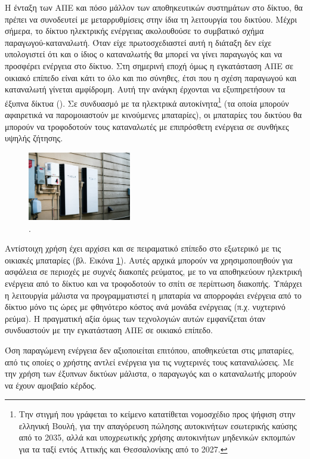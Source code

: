 \documentclass[12pt]{report}
\begin{document}
Η ένταξη των ΑΠΕ και πόσο μάλλον των αποθηκευτικών συστημάτων στο δίκτυο, θα πρέπει να συνοδευτεί με μεταρρυθμίσεις στην ίδια τη λειτουργία του δικτύου. Μέχρι σήμερα, το δίκτυο ηλεκτρικής ενέργειας ακολουθούσε το συμβατικό σχήμα 
παραγωγού-καταναλωτή. Όταν είχε πρωτοσχεδιαστεί αυτή η διάταξη δεν είχε υπολογιστεί ότι και ο ίδιος ο καταναλωτής θα μπορεί να γίνει παραγωγός και να προσφέρει ενέργεια στο δίκτυο. Στη σημερινή εποχή όμως η εγκατάσταση ΑΠΕ σε 
οικιακό επίπεδο είναι κάτι το όλο και πιο σύνηθες, έτσι που η σχέση παραγωγού και καταναλωτή γίνεται αμφίδρομη. Αυτή την ανάγκη έρχονται να εξυπηρετήσουν τα έξυπνα δίκτυα ({}). Σε συνδυασμό με τα ηλεκτρικά 
αυτοκίνητα\footnote{Την στιγμή που γράφεται το κείμενο κατατίθεται νομοσχέδιο προς ψήφιση στην ελληνική Βουλή, για την απαγόρευση πώλησης αυτοκινήτων εσωτερικής καύσης από το 2035, αλλά και υποχρεωτικής χρήσης αυτοκινήτων μηδενικών 
εκπομπών για τα ταξί εντός Αττικής και Θεσσαλονίκης από το 2027.} (τα οποία μπορούν αφαιρετικά να παρομοιαστούν με κινούμενες μπαταρίες), οι μπαταρίες του δικτύου θα μπορούν να τροφοδοτούν τους καταναλωτές με επιπρόσθετη ενέργεια σε 
συνθήκες υψηλής ζήτησης.

\begin{figure}[h]
				\center
				\includegraphics[width=0.4\textwidth]{powerwall}
				\captionsetup{name=Εικόνα}
				\caption{{}.}
				\label{fig:powerwall}
\end{figure}

Αντίστοιχη χρήση έχει αρχίσει και σε πειραματικό επίπεδο στο εξωτερικό με τις οικιακές μπαταρίες (βλ. Εικόνα \ref{fig:powerwall}). Αυτές αρχικά μπορούν να χρησιμοποιηθούν για ασφάλεια σε περιοχές με συχνές διακοπές ρεύματος, με το 
να αποθηκεύουν ηλεκτρική ενέργεια από το δίκτυο και να τροφοδοτούν το σπίτι σε περίπτωση διακοπής. Υπάρχει η λειτουργία μάλιστα να προγραμματιστεί η μπαταρία να απορροφάει ενέργεια από το δίκτυο μόνο τις ώρες με φθηνότερο κόστος 
ανά μονάδα ενέργειας (π.χ. νυχτερινό ρεύμα). Η πραγματική αξία όμως των τεχνολογιών αυτών εμφανίζεται όταν συνδυαστούν με την εγκατάσταση ΑΠΕ σε οικιακό επίπεδο. 

Όση παραγώμενη ενέργεια δεν αξιοποιείται επιτόπου, αποθηκεύεται στις μπαταρίες, από τις οποίες ο χρήστης αντλεί ενέργεια για τις νυχτερινές τους καταναλώσεις. Με την χρήση των έξυπνων δικτύων μάλιστα, ο παραγωγός και ο 	
καταναλωτής μπορούν να έχουν αμοιβαίο κέρδος. 
\end{document}
